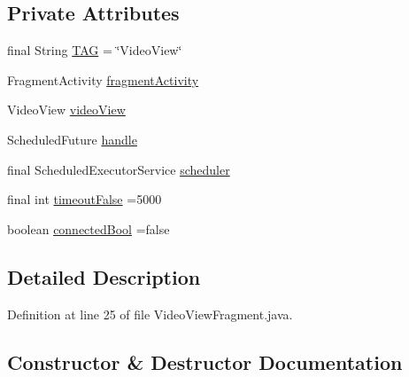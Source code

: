 \subsection*{Private Attributes}
\begin{DoxyCompactItemize}
\item 
final String \hyperlink{classpt_1_1lsts_1_1asa_1_1fragments_1_1VideoViewFragment_aba4ef1bec9e8ed8234b57753c016a124}{T\+A\+G} = \char`\"{}Video\+View\char`\"{}
\item 
Fragment\+Activity \hyperlink{classpt_1_1lsts_1_1asa_1_1fragments_1_1VideoViewFragment_aeb88f42f68296885aed21df5ef1296a8}{fragment\+Activity}
\item 
Video\+View \hyperlink{classpt_1_1lsts_1_1asa_1_1fragments_1_1VideoViewFragment_a2a48c818563de3b28b98778928088cd1}{video\+View}
\item 
Scheduled\+Future \hyperlink{classpt_1_1lsts_1_1asa_1_1fragments_1_1VideoViewFragment_a895a83974690a3457694a7785f0166c1}{handle}
\item 
final Scheduled\+Executor\+Service \hyperlink{classpt_1_1lsts_1_1asa_1_1fragments_1_1VideoViewFragment_a4d2b6fb27e4dc4d86576cba1158f1b8a}{scheduler}
\item 
final int \hyperlink{classpt_1_1lsts_1_1asa_1_1fragments_1_1VideoViewFragment_ad90f5f78e9fb42d5b0d4c64ccc94b8f5}{timeout\+False} =5000
\item 
boolean \hyperlink{classpt_1_1lsts_1_1asa_1_1fragments_1_1VideoViewFragment_a5581d477ef3c120697f7871e520f213c}{connected\+Bool} =false
\end{DoxyCompactItemize}


\subsection{Detailed Description}


Definition at line 25 of file Video\+View\+Fragment.\+java.



\subsection{Constructor \& Destructor Documentation}
\hypertarget{classpt_1_1lsts_1_1asa_1_1fragments_1_1VideoViewFragment_ab72d2ab3013b36180d4d971894785cb5}{}
